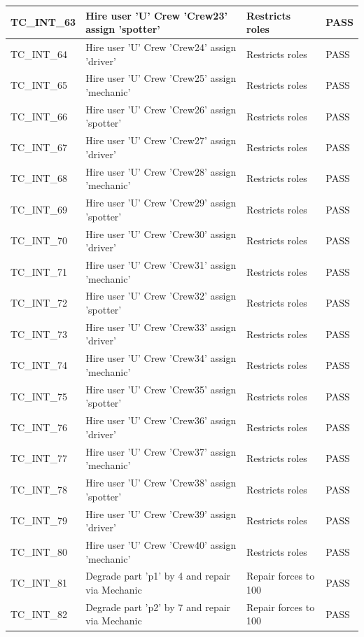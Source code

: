 \documentclass{article}
\begin{document}
\begin{longtable}{|p{2cm}|p{8cm}|p{3cm}|p{2cm}|}
\hline
TC\_INT\_63 & Hire user 'U' Crew 'Crew23' assign 'spotter' & Restricts roles & PASS \\
\hline
TC\_INT\_64 & Hire user 'U' Crew 'Crew24' assign 'driver' & Restricts roles & PASS \\
\hline
TC\_INT\_65 & Hire user 'U' Crew 'Crew25' assign 'mechanic' & Restricts roles & PASS \\
\hline
TC\_INT\_66 & Hire user 'U' Crew 'Crew26' assign 'spotter' & Restricts roles & PASS \\
\hline
TC\_INT\_67 & Hire user 'U' Crew 'Crew27' assign 'driver' & Restricts roles & PASS \\
\hline
TC\_INT\_68 & Hire user 'U' Crew 'Crew28' assign 'mechanic' & Restricts roles & PASS \\
\hline
TC\_INT\_69 & Hire user 'U' Crew 'Crew29' assign 'spotter' & Restricts roles & PASS \\
\hline
TC\_INT\_70 & Hire user 'U' Crew 'Crew30' assign 'driver' & Restricts roles & PASS \\
\hline
TC\_INT\_71 & Hire user 'U' Crew 'Crew31' assign 'mechanic' & Restricts roles & PASS \\
\hline
TC\_INT\_72 & Hire user 'U' Crew 'Crew32' assign 'spotter' & Restricts roles & PASS \\
\hline
TC\_INT\_73 & Hire user 'U' Crew 'Crew33' assign 'driver' & Restricts roles & PASS \\
\hline
TC\_INT\_74 & Hire user 'U' Crew 'Crew34' assign 'mechanic' & Restricts roles & PASS \\
\hline
TC\_INT\_75 & Hire user 'U' Crew 'Crew35' assign 'spotter' & Restricts roles & PASS \\
\hline
TC\_INT\_76 & Hire user 'U' Crew 'Crew36' assign 'driver' & Restricts roles & PASS \\
\hline
TC\_INT\_77 & Hire user 'U' Crew 'Crew37' assign 'mechanic' & Restricts roles & PASS \\
\hline
TC\_INT\_78 & Hire user 'U' Crew 'Crew38' assign 'spotter' & Restricts roles & PASS \\
\hline
TC\_INT\_79 & Hire user 'U' Crew 'Crew39' assign 'driver' & Restricts roles & PASS \\
\hline
TC\_INT\_80 & Hire user 'U' Crew 'Crew40' assign 'mechanic' & Restricts roles & PASS \\
\hline
TC\_INT\_81 & Degrade part 'p1' by 4 and repair via Mechanic & Repair forces to 100 & PASS \\
\hline
TC\_INT\_82 & Degrade part 'p2' by 7 and repair via Mechanic & Repair forces to 100 & PASS \\

\end{longtable}
\end{document}
